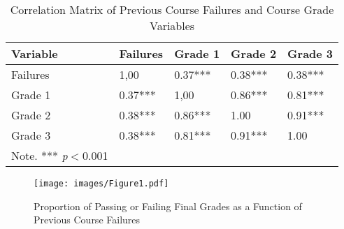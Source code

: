 \documentclass[sigconf]{acmart}
\begin{document}

\begin{table}
  \caption{Correlation Matrix of Previous Course Failures and Course Grade 
  Variables}
  \label{tab:freq}
  \begin{tabular}{lllll}
    \toprule
    Variable    & Failures  & Grade 1 & Grade 2 & Grade 3  \\
    \midrule
    Failures    &  1,00     &  0.37***  & 0.38***   &  0.38***  \\
    Grade 1     &  0.37***  &  1,00     & 0.86***   &  0.81***  \\
    Grade 2     &  0.38***  &  0.86***  & 1.00      &  0.91***  \\  
    Grade 3     &  0.38***  &  0.81***  & 0.91***   &  1.00     \\    
    \bottomrule
    Note. *** \textit{p}$<$0.001 & & &
  \end{tabular}
\end{table}


\begin{figure}[!ht]
  \centering\texttt{[image: images/Figure1.pdf]}
  \caption{Proportion of Passing or Failing Final Grades as a 
  Function of Previous Course Failures}
  \label{f:Figure1}
\end{figure} 
 
 
\end{document}
